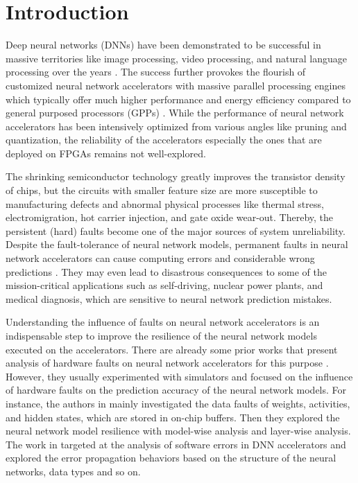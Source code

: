 \section{Introduction} \label{sec:introduction}
Deep neural networks (DNNs) have been demonstrated to be successful in 
massive territories like image processing, video processing, and 
natural language processing over the years \cite{Gatys_2016_CVPR, Collobert:2008:UAN:1390156.1390177, Chen_2015_ICCV}. The success further provokes the 
flourish of customized neural network accelerators 
with massive parallel processing engines which typically offer
much higher performance and energy efficiency compared to 
general purposed processors (GPPs) 
\cite{chen2014diannao, chen2014dadiannao,  chen2016eyeriss, Zhang:2015:OFA:2684746.2689060, 7551397}.
While the performance of neural network accelerators has been intensively 
optimized from various angles like pruning and quantization, 
the reliability of the accelerators especially 
the ones that are deployed on FPGAs remains not well-explored.

The shrinking semiconductor technology greatly improves the 
transistor density of chips, but the circuits with smaller 
feature size are more susceptible to manufacturing defects and abnormal 
physical processes like thermal stress, electromigration, 
hot carrier injection, and gate oxide wear-out. Thereby, the 
persistent (hard) faults become one of the major sources 
of system unreliability. Despite the fault-tolerance of 
neural network models, permanent faults in neural network 
accelerators can cause computing errors and considerable 
wrong predictions \cite{238315}. They may even lead to disastrous 
consequences to some of the mission-critical applications such as 
self-driving, nuclear power plants, and medical diagnosis, 
which are sensitive to neural network prediction mistakes. 

Understanding the influence of faults on neural network accelerators 
is an indispensable step to improve the resilience of the neural 
network models executed on the accelerators. There are already some 
prior works that present analysis of hardware faults on neural network 
accelerators for this purpose \cite{Reagen2018, Kausar2016Artificial, Li2018TensorFI, Li2017, Salami2018}. However, they usually experimented with 
simulators and focused on the influence of hardware faults on the 
prediction accuracy of the neural network models. 
For instance, the authors in \cite{Reagen2018} 
mainly investigated the data faults of weights, activities, 
and hidden states, which are stored in on-chip buffers.
Then they explored the neural network model resilience with 
model-wise analysis and layer-wise analysis. The work 
in \cite{Li2017} targeted at the analysis of software errors 
in DNN accelerators and explored the error propagation 
behaviors based on the structure of the neural networks, 
data types and so on. 

